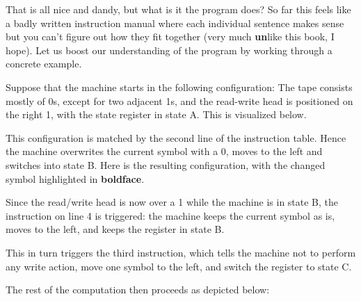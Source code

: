 \begin{examplebox}
    That is all nice and dandy, but what is it the program does?
    So far this feels like a badly written instruction manual where each individual sentence makes sense but you can't figure out how they fit together (very much \textbf{un}like this book, I hope).
    Let us boost our understanding of the program by working through a concrete example.

    Suppose that the machine starts in the following configuration: 
    The tape consists mostly of 0s, except for two adjacent 1s, and the read-write head is positioned on the right 1, with the state register in state A.
    This is visualized below.
    \begin{center}
    \end{center}
    This configuration is matched by the second line of the instruction table.
    Hence the machine overwrites the current symbol with a 0, moves to the left and switches into state B\@.
    Here is the resulting configuration, with the changed symbol highlighted in \textbf{boldface}.
    \begin{center}
    \end{center}
    Since the read/write head is now over a 1 while the machine is in state B, the instruction on line 4 is triggered: the machine keeps the current symbol as is, moves to the left, and keeps the register in state B\@.
    \begin{center}
    \end{center}
    This in turn triggers the third instruction, which tells the machine not to perform any write action, move one symbol to the left, and switch the register to state C\@. 
    \begin{center}
    \end{center}
    The rest of the computation then proceeds as depicted below:
    \begin{center}









\end{center}
\end{examplebox}
